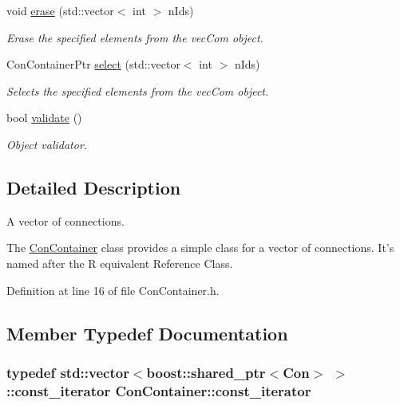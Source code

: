 \begin{DoxyCompactItemize}
void \hyperlink{class_con_container_a9665acde2f526ae4207b919c90615fe5}{erase} (std::vector$<$ int $>$ nIds)
\begin{DoxyCompactList}\small\item\em Erase the specified elements from the vecCom object. \end{DoxyCompactList}\item 
ConContainerPtr \hyperlink{class_con_container_a7fb490683bd4733cae3c6428bad9328c}{select} (std::vector$<$ int $>$ nIds)
\begin{DoxyCompactList}\small\item\em Selects the specified elements from the vecCom object. \end{DoxyCompactList}\item 
bool \hyperlink{class_con_container_aac12a3d3604db9ff715503816109470c}{validate} ()
\begin{DoxyCompactList}\small\item\em Object validator. \end{DoxyCompactList}\end{DoxyCompactItemize}


\subsection{Detailed Description}
A vector of connections. 

The \hyperlink{class_con_container}{ConContainer} class provides a simple class for a vector of connections. It's named after the R equivalent Reference Class. 

Definition at line 16 of file ConContainer.h.



\subsection{Member Typedef Documentation}
\hypertarget{class_con_container_ac314ee4e351b3a5f595cd1de74fb3b5e}{
\subsubsection[{const\_\-iterator}]{\setlength{\rightskip}{0pt plus 5cm}typedef std::vector$<$boost::shared\_\-ptr$<${\bf Con}$>$ $>$::{\bf const\_\-iterator} {\bf ConContainer::const\_\-iterator}}}
\label{class_con_container_ac314ee4e351b3a5f595cd1de74fb3b5e}


